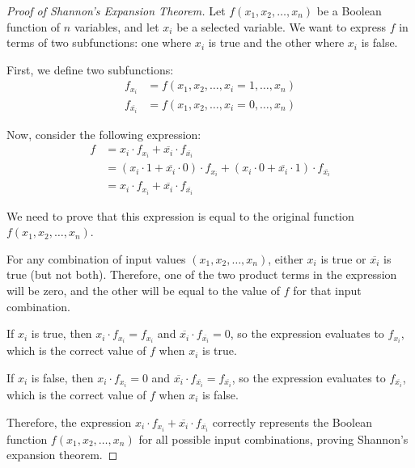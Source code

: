     \begin{proof}[Proof of Shannon's Expansion Theorem]
        Let $f(x_1, x_2, \ldots, x_n)$ be a Boolean function of $n$ variables, and let $x_i$ be a selected variable. We want to express $f$ in terms of two subfunctions: one where $x_i$ is true and the other where $x_i$ is false.
        
        First, we define two subfunctions:
        \begin{align*}
        f_{x_i} &= f(x_1, x_2, \ldots, x_i=1, \ldots, x_n) \\
        f_{\overline{x_i}} &= f(x_1, x_2, \ldots, x_i=0, \ldots, x_n)
        \end{align*}
        
        Now, consider the following expression:
        \begin{align*}
        f &= x_i \cdot f_{x_i} + \overline{x_i} \cdot f_{\overline{x_i}} \\
           &= (x_i \cdot 1 + \overline{x_i} \cdot 0) \cdot f_{x_i} + (x_i \cdot 0 + \overline{x_i} \cdot 1) \cdot f_{\overline{x_i}} \\
           &= x_i \cdot f_{x_i} + \overline{x_i} \cdot f_{\overline{x_i}}
        \end{align*}
        
        We need to prove that this expression is equal to the original function $f(x_1, x_2, \ldots, x_n)$.
        
        For any combination of input values $(x_1, x_2, \ldots, x_n)$, either $x_i$ is true or $\overline{x_i}$ is true (but not both). Therefore, one of the two product terms in the expression will be zero, and the other will be equal to the value of $f$ for that input combination.
        
        If $x_i$ is true, then $x_i \cdot f_{x_i} = f_{x_i}$ and $\overline{x_i} \cdot f_{\overline{x_i}} = 0$, so the expression evaluates to $f_{x_i}$, which is the correct value of $f$ when $x_i$ is true.
        
        If $x_i$ is false, then $x_i \cdot f_{x_i} = 0$ and $\overline{x_i} \cdot f_{\overline{x_i}} = f_{\overline{x_i}}$, so the expression evaluates to $f_{\overline{x_i}}$, which is the correct value of $f$ when $x_i$ is false.
        
        Therefore, the expression $x_i \cdot f_{x_i} + \overline{x_i} \cdot f_{\overline{x_i}}$ correctly represents the Boolean function $f(x_1, x_2, \ldots, x_n)$ for all possible input combinations, proving Shannon's expansion theorem.
        \end{proof}
